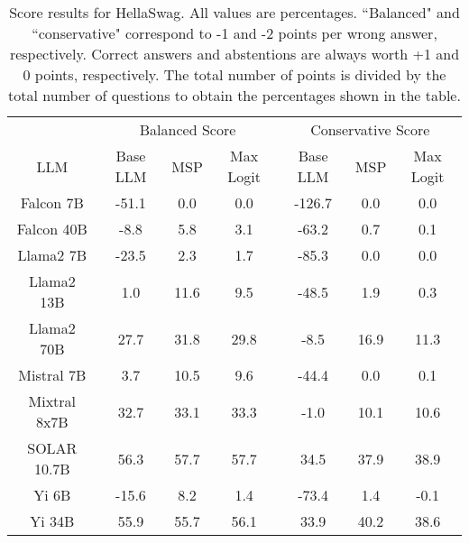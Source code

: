 \begin{table*}
\centering
\begin{tabular}{c|c|c|c|c|c|c}
& \multicolumn{3}{c|}{Balanced Score} & \multicolumn{3}{c}{Conservative Score} \\ 
LLM & Base LLM & MSP & Max Logit & Base LLM & MSP & Max Logit\\ \hline
Falcon 7B & -51.1 & 0.0 & 0.0 & -126.7 & 0.0 & 0.0\\
Falcon 40B & -8.8 & 5.8 & 3.1 & -63.2 & 0.7 & 0.1\\
Llama2 7B & -23.5 & 2.3 & 1.7 & -85.3 & 0.0 & 0.0\\
Llama2 13B & 1.0 & 11.6 & 9.5 & -48.5 & 1.9 & 0.3\\
Llama2 70B & 27.7 & 31.8 & 29.8 & -8.5 & 16.9 & 11.3\\
Mistral 7B & 3.7 & 10.5 & 9.6 & -44.4 & 0.0 & 0.1\\
Mixtral 8x7B & 32.7 & 33.1 & 33.3 & -1.0 & 10.1 & 10.6\\
SOLAR 10.7B & 56.3 & 57.7 & 57.7 & 34.5 & 37.9 & 38.9\\
Yi 6B & -15.6 & 8.2 & 1.4 & -73.4 & 1.4 & -0.1\\
Yi 34B & 55.9 & 55.7 & 56.1 & 33.9 & 40.2 & 38.6\\
\hline
\end{tabular}
\caption{Score results for HellaSwag. All values are percentages. ``Balanced" and ``conservative" correspond to -1 and -2 points per wrong answer, respectively. Correct answers and abstentions are always worth +1 and 0 points, respectively. The total number of points is divided by the total number of questions to obtain the percentages shown in the table.}
\label{tab:hellaswag_score}
\end{table*}

